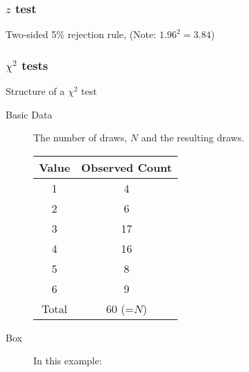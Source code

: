 \documentclass[handout]{beamer}
\begin{document}


   \begin{frame}
   \frametitle{$z$ test}
   \begin{center}
   \end{center}
   {\color{blue} Two-sided 5\% rejection rule}, (Note: $1.96^2 = 3.84$)
   \end{frame}


   \begin{frame} \frametitle{$\chi^2$ tests}

   \begin{block}
     {Structure of a $\chi^2$ test}
     \begin{description}
     \item[Basic Data] The number of draws, $N$ and the resulting draws.

     \begin{tabular}{c|c}
       Value & Observed Count \\ \hline
       1 & 4   \\
       2 & 6 \\
       3 & 17 \\
       4 & 16 \\
       5 & 8 \\
       6 & 9 \\  \hline
       Total & 60 (=$N$) \\
     \end{tabular}

     \item[Box] In this example: 
     \end{description}
   \end{block}
   \end{frame}
\end{document}
